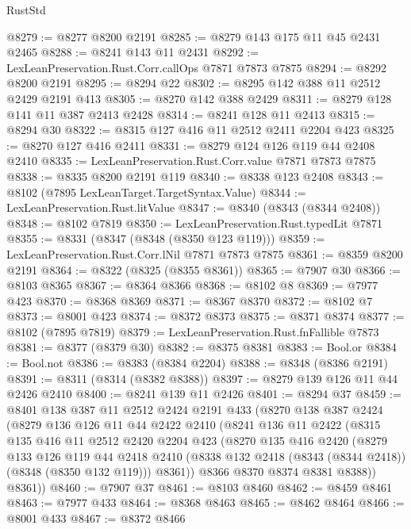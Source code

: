 \begin{lexlean}{RustStd}
\begin{coremodule}
@8279 := @8277 @8200 @2191
@8285 := @8279 @143 @175 @11 @45 @2431 @2465
@8288 := @8241 @143 @11 @2431
@8292 := LexLeanPreservation.Rust.Corr.callOps @7871 @7873 @7875
@8294 := @8292 @8200 @2191
@8295 := @8294 @22
@8302 := @8295 @142 @388 @11 @2512 @2429 @2191 @413
@8305 := @8270 @142 @388 @2429
@8311 := @8279 @128 @141 @11 @387 @2413 @2428
@8314 := @8241 @128 @11 @2413
@8315 := @8294 @30
@8322 := @8315 @127 @416 @11 @2512 @2411 @2204 @423
@8325 := @8270 @127 @416 @2411
@8331 := @8279 @124 @126 @119 @44 @2408 @2410
@8335 := LexLeanPreservation.Rust.Corr.value @7871 @7873 @7875
@8338 := @8335 @8200 @2191 @119
@8340 := @8338 @123 @2408
@8343 := @8102 (@7895 LexLeanTarget.TargetSyntax.Value)
@8344 := LexLeanPreservation.Rust.litValue
@8347 := @8340 (@8343 (@8344 @2408))
@8348 := @8102 @7819
@8350 := LexLeanPreservation.Rust.typedLit @7871
@8355 := @8331 (@8347 (@8348 (@8350 @123 @119)))
@8359 := LexLeanPreservation.Rust.Corr.lNil @7871 @7873 @7875
@8361 := @8359 @8200 @2191
@8364 := @8322 (@8325 (@8355 @8361))
@8365 := @7907 @30
@8366 := @8103 @8365
@8367 := @8364 @8366
@8368 := @8102 @8
@8369 := @7977 @423
@8370 := @8368 @8369
@8371 := @8367 @8370
@8372 := @8102 @7
@8373 := @8001 @423
@8374 := @8372 @8373
@8375 := @8371 @8374
@8377 := @8102 (@7895 @7819)
@8379 := LexLeanPreservation.Rust.fnFallible @7873
@8381 := @8377 (@8379 @30)
@8382 := @8375 @8381
@8383 := Bool.or
@8384 := Bool.not
@8386 := @8383 (@8384 @2204)
@8388 := @8348 (@8386 @2191)
@8391 := @8311 (@8314 (@8382 @8388))
@8397 := @8279 @139 @126 @11 @44 @2426 @2410
@8400 := @8241 @139 @11 @2426
@8401 := @8294 @37
@8459 := @8401
    @138
    @387
    @11
    @2512
    @2424
    @2191
    @433
    (@8270
      @138
      @387
      @2424
      (@8279
        @136
        @126
        @11
        @44
        @2422
        @2410
        (@8241
          @136
          @11
          @2422
          (@8315
            @135
            @416
            @11
            @2512
            @2420
            @2204
            @423
            (@8270
              @135
              @416
              @2420
              (@8279
                @133
                @126
                @119
                @44
                @2418
                @2410
                (@8338 @132 @2418 (@8343 (@8344 @2418)) (@8348 (@8350 @132 @119)))
                @8361))
            @8366
            @8370
            @8374
            @8381
            @8388))
        @8361))
@8460 := @7907 @37
@8461 := @8103 @8460
@8462 := @8459 @8461
@8463 := @7977 @433
@8464 := @8368 @8463
@8465 := @8462 @8464
@8466 := @8001 @433
@8467 := @8372 @8466

\end{coremodule}
\end{lexlean}
